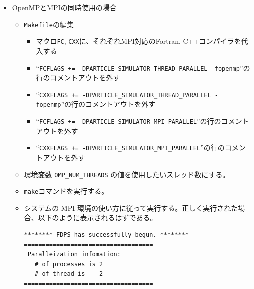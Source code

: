 \documentclass[12pt,a4paper,dvipdfmx]{jarticle}
\begin{document}
\begin{itemize}
\item OpenMPとMPIの同時使用の場合
  \begin{itemize}
  \item \texttt{Makefile}の編集
    \begin{itemize}
    \item マクロ\texttt{FC}, \texttt{CXX}に、それぞれMPI対応のFortran, C++コンパイラを代入する
    \item ``\texttt{FCFLAGS += -DPARTICLE\_SIMULATOR\_THREAD\_PARALLEL -fopenmp}''の行のコメントアウトを外す
    \item ``\texttt{CXXFLAGS += -DPARTICLE\_SIMULATOR\_THREAD\_PARALLEL -fopenmp}''の行のコメントアウトを外す
    \item ``\texttt{FCFLAGS += -DPARTICLE\_SIMULATOR\_MPI\_PARALLEL}''の行のコメントアウトを外す
    \item ``\texttt{CXXFLAGS += -DPARTICLE\_SIMULATOR\_MPI\_PARALLEL}''の行のコメントアウトを外す
    \end{itemize}
  \item 環境変数 \texttt{OMP\_NUM\_THREADS} の値を使用したいスレッド数にする。
  \item \texttt{make}コマンドを実行する。
  \item システムの MPI 環境の使い方に従って実行する。正しく実行された場合、以下のように表示されるはずである。
\begin{screen}
\begin{verbatim}
******** FDPS has successfully begun. ********
====================================
 Paralleization infomation:
   # of processes is 2
   # of thread is    2
====================================
\end{verbatim}
\end{screen}
\end{itemize}
\end{itemize}
\end{document}
